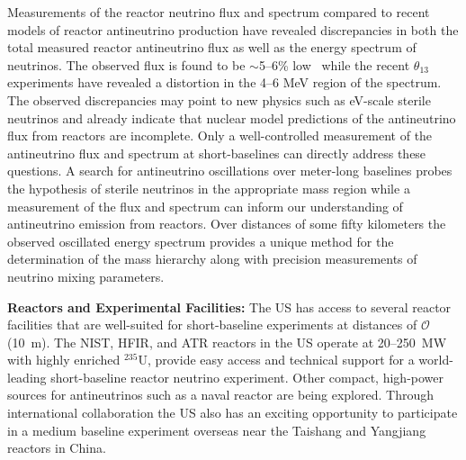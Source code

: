 Measurements of the reactor neutrino flux and spectrum compared to
recent models of reactor antineutrino production have revealed
discrepancies in both the total measured reactor antineutrino flux as
well as the energy spectrum of neutrinos. The observed flux is found
to be $\sim$5--6\% low~\cite{Mention:2011rk, Zhang:2013ela} while the
recent $\theta_{13}$ experiments have revealed a distortion in the 4--6
MeV region of the spectrum.  The observed discrepancies may point to
new physics such as eV-scale sterile neutrinos and already indicate
that nuclear model predictions of the antineutrino flux from
reactors are incomplete.  Only a well-controlled measurement of the
antineutrino flux and spectrum at short-baselines can directly address
these questions. A search for antineutrino oscillations over
meter-long baselines probes the hypothesis of sterile neutrinos in the
appropriate mass region while a measurement of the flux and spectrum
can inform our understanding of antineutrino emission from reactors.
Over distances of some fifty kilometers the observed oscillated energy
spectrum provides a unique method for the determination of the mass
hierarchy along with precision measurements of neutrino mixing
parameters.

{\bf Reactors and Experimental Facilities:}
The US has access to several reactor facilities that are
well-suited for short-baseline experiments at distances of
$\mathcal{O}$(10~m). The NIST, HFIR, and ATR reactors in the US
operate at 20--250~MW with highly enriched $^{235}$U, provide easy
access and technical support for a world-leading short-baseline
reactor neutrino experiment. Other compact, high-power sources for
antineutrinos such as a naval reactor are being explored. Through
international collaboration the US also has an exciting opportunity to
participate in a medium baseline experiment overseas near the Taishang
and Yangjiang reactors in China.


